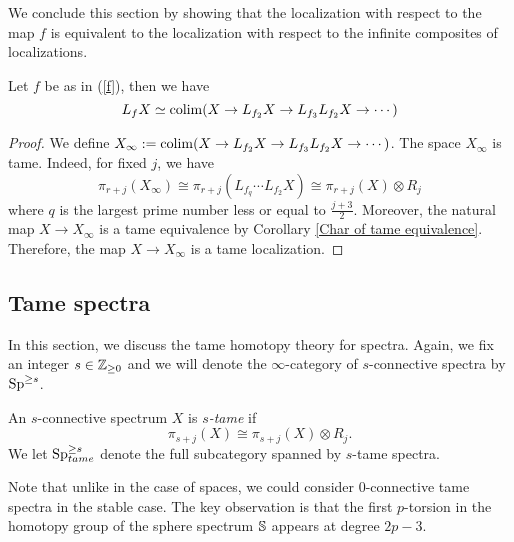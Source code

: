 We conclude this section by showing that the localization with respect to the map $f$ is equivalent to the localization with respect to the infinite composites of localizations.
\begin{corollary}
	\label{Characterization of tame localization}
	Let $f$ be as in (\ref{f}), then we have
	\[
	L_f X \simeq \operatorname{colim}(X\to L_{f_2}X\to L_{f_3}L_{f_2}X\to \cdots)
	\]	
\end{corollary}
\begin{proof}
	We define $X_{\infty}:=\operatorname{colim}(X\to L_{f_2}X\to L_{f_3}L_{f_2}X\to \cdots)$. 
	The space $X_\infty$ is tame. Indeed, for fixed $j$, we have
	\[
	\pi_{r+j}(X_{\infty})\cong \pi_{r+j}(L_{f_q}\cdots L_{f_2}X)\cong \pi_{r+j}(X) \otimes R_{j}
	\]
	where $q$ is the largest prime number less or equal to $\frac{j+3}{2}$. Moreover, the natural map $X\to X_{\infty}$ is a tame equivalence by Corollary \ref{Char of tame equivalence}. Therefore, the map $X\to X_{\infty}$ is a tame localization.
\end{proof}
\subsection{Tame spectra}

In this section, we discuss the tame homotopy theory for spectra. Again, we fix an integer $s\in {\mathbb{Z}}_{\geq 0}$ and we will denote the $\infty$-category of $s$-connective spectra by $\operatorname{Sp}^{\geq s}$.
\begin{definition}
	An $s$-connective spectrum $X$ is \emph{$s$-tame} if 
	\[
	\pi_{s+j}(X)\cong \pi_{s+j}(X)\otimes R_{j}.
	\]
	We let $\operatorname{Sp}^{\geq s}_{tame}$ denote the full subcategory spanned by $s$-tame spectra.
\end{definition}

\begin{remark}
	Note that unlike in the case of spaces, we could consider $0$-connective tame spectra in the stable case.
	The key observation is that the first $p$-torsion in the homotopy group of the sphere spectrum ${\mathbb{S}}$ appears at degree $2p-3$.
\end{remark}

